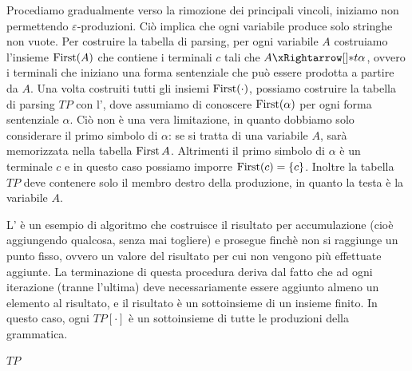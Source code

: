 Procediamo gradualmente verso la rimozione dei principali vincoli, iniziamo non permettendo $\varepsilon$-produzioni.
Ciò implica che ogni variabile produce solo stringhe non vuote.
Per costruire la tabella di parsing, per ogni variabile $A$ costruiamo l'insieme $\operatorname{First}(A)$ che contiene i terminali
$c$ tali che $A \eprod{} t\alpha$, ovvero i terminali che iniziano una forma sentenziale che può essere prodotta a partire
da $A$.
Una volta costruiti tutti gli insiemi $\operatorname{First}(\cdot)$, possiamo costruire la tabella di parsing $TP$ con
l', dove assumiamo di conoscere $\operatorname{First}(\alpha)$ per ogni forma
sentenziale $\alpha$.
Ciò non è una vera limitazione, in quanto dobbiamo solo considerare il primo simbolo di $\alpha$: se si tratta di una
variabile $A$, sarà memorizzata nella tabella $\operatorname{First}{A}$.
Altrimenti il primo simbolo di $\alpha$ è un terminale $c$ e in questo caso possiamo imporre $\operatorname{First}(c) = \{c\}$.
Inoltre la tabella $TP$ deve contenere solo il membro destro della produzione, in quanto la testa è la
variabile $A$.

L' è un esempio di algoritmo che costruisce il risultato per
  accumulazione (cioè aggiungendo qualcosa, senza mai togliere) e prosegue finchè non si raggiunge un punto fisso,
  ovvero un valore del risultato per cui non vengono più effettuate aggiunte.
La terminazione di questa procedura deriva dal fatto che ad ogni iterazione (tranne l'ultima) deve necessariamente
essere aggiunto almeno un elemento al risultato, e il risultato è un sottoinsieme di un insieme finito.
In questo caso, ogni $TP[\cdot]$ è un sottoinsieme di tutte le produzioni della grammatica.



\begin{algorithm}[tb!]
\caption{Costruzione della tabella di parsing $TP$ in assenza di \epsprod}
\label{alg:costruzione-tabella-parsing-da-first}
\Return $TP$
\end{algorithm}


